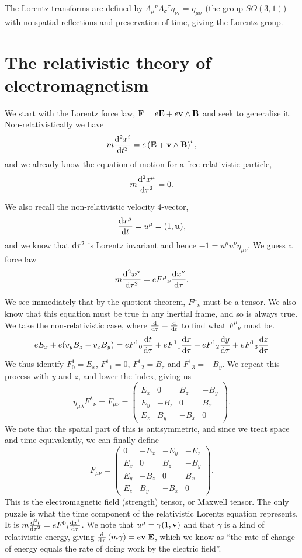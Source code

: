 \documentclass{notes}
\newcommand{\B}{\vect{B}}
\newcommand{\E}{\vect{E}}
\begin{document}
The Lorentz transforms are defined by $\Lambda_\mu{}^\nu
\Lambda_\sigma{}^\tau \eta_{\nu \tau} = \eta_{\mu \sigma}$ (the group
$SO(3,1)$) with no spatial reflections and preservation of time,
giving the Lorentz group.

\chapter[Relativistic Electromagnetism]%
{The relativistic theory of electromagnetism}

We start with the Lorentz force law, $\vect{F} = e \E + e \vect{v} \wedge
\B$ and seek to generalise it.  Non-relativistically we have
\[
m \diff{^2x^i}{t^2} = e \left( \E + \vect{v} \wedge \B \right)^i,
\]
and we already know the equation of motion for a free relativistic particle,
\[
m \frac{\mathrm{d}^2x^\mu}{\mathrm{d}\tau^2} = 0.
\]

We also recall the non-relativistic velocity 4-vector,
\[
\frac{\mathrm{d} x^\mu}{\mathrm{d} t} = u^\mu = (1,\mathbf{u}),
\]
and we know that $\mathrm{d} \tau^2$ is Lorentz invariant and hence
$-1 = u^\mu u^\nu \eta_{\mu \nu}$.  We guess a force law
\[
m \frac{\mathrm{d}^2 x^\mu}{\mathrm{d}\tau^2} = e F^\mu{}_\nu \frac{\mathrm{d} x^\nu}{\mathrm{d}\tau}.
\]

We see immediately that by the quotient theorem, $F^\mu{}_\nu$ must be
a tensor.  We also know that this equation must be true in any inertial
frame, and so is always true.  We take the non-relativistic case,
where $\frac{\mathrm{d}}{\mathrm{d}\tau} = \frac{\mathrm{d}}{\mathrm{d} t}$ to find what $F^\mu{}_\nu$ must be.
\[
e E_x + e ( v_y B_z - v_z B_y)
= e F^1{}_0 \frac{\mathrm{d} t}{\mathrm{d}\tau} + e F^1{}_1 \frac{\mathrm{d} x}{\mathrm{d}\tau}
+ e F^1{}_2 \frac{\mathrm{d} y}{\mathrm{d}\tau} + e F^1{}_3 \frac{\mathrm{d} z}{\mathrm{d}\tau}
\]
We thus identify $F^1_{0} = E_x$, $F^1{}_1 = 0$, $F^1{}_2 = B_z$ and
$F^1{}_3 = - B_y$.  We repeat this process with $y$ and $z$, and
lower the index, giving us
\[
\eta_{\mu \lambda} F^\lambda{}_\nu
= F_{\mu \nu}
= \begin{pmatrix}
 & & & \\
E_x & 0 & B_z & -B_y \\
E_y & -B_z & 0 & B_x \\
E_z & B_y & - B_x & 0
\end{pmatrix}.
\]
We note that the spatial part of this is antisymmetric, and since we
treat space and time equivalently, we can finally define
\[
F_{\mu \nu}
= \begin{pmatrix}
0 & - E_x & - E_y & - E_z \\
E_x & 0 & B_z & -B_y \\
E_y & -B_z & 0 & B_x \\
E_z & B_y & - B_x & 0
\end{pmatrix}.
\]
This is the electromagnetic field (strength) tensor, or Maxwell tensor.
The only puzzle is what the time component of the relativistic Lorentz
equation represents.  It is $m \frac{\mathrm{d}^2 t}{\mathrm{d}\tau^2} = e F^0{}_i
\frac{\mathrm{d} x^i}{\mathrm{d}\tau}$.  We note that $u^\mu = \gamma (1,\mathbf{v})$
and that $\gamma$ is a kind of relativistic energy, giving
$\diff{}{\tau} \left( m \gamma \right) = e \vect{v} . \E$, which we
know as ``the rate of change of energy equals the rate of doing work
by the electric field''.
\end{document}
